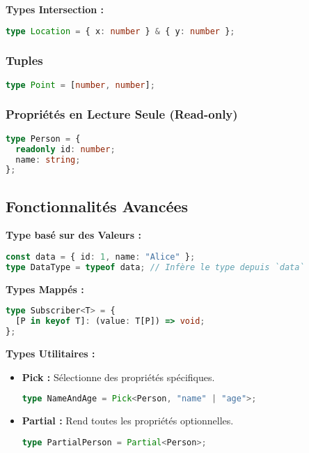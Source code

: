 \documentclass[a4paper,12pt]{article}
\begin{document}
\textbf{Types Intersection :}
\begin{lstlisting}[language=TypeScript]
type Location = { x: number } & { y: number };
\end{lstlisting}

\subsubsection*{Tuples}
\begin{lstlisting}[language=TypeScript]
type Point = [number, number];
\end{lstlisting}

\subsubsection*{Propriétés en Lecture Seule (Read-only)}
\begin{lstlisting}[language=TypeScript]
type Person = {
  readonly id: number;
  name: string;
};
\end{lstlisting}

\subsection*{Fonctionnalités Avancées}
\textbf{Type basé sur des Valeurs :}
\begin{lstlisting}[language=TypeScript]
const data = { id: 1, name: "Alice" };
type DataType = typeof data; // Infère le type depuis `data`
\end{lstlisting}

\textbf{Types Mappés :}
\begin{lstlisting}[language=TypeScript]
type Subscriber<T> = {
  [P in keyof T]: (value: T[P]) => void;
};
\end{lstlisting}

\textbf{Types Utilitaires :}
\begin{itemize}
    \item \textbf{Pick :} Sélectionne des propriétés spécifiques.
    \begin{lstlisting}[language=TypeScript]
    type NameAndAge = Pick<Person, "name" | "age">;
    \end{lstlisting}
    \item \textbf{Partial :} Rend toutes les propriétés optionnelles.
    \begin{lstlisting}[language=TypeScript]
    type PartialPerson = Partial<Person>;
    \end{lstlisting}
\end{itemize}
\end{document}
